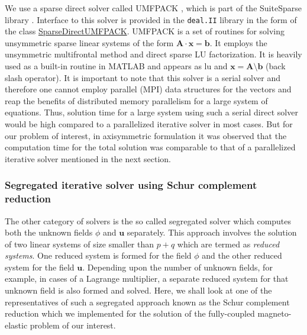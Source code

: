We use a sparse direct solver called UMFPACK \cite{davis2004algorithm}, which is part of the SuiteSparse library \cite{davis2015suitesparse}. Interface to this solver is provided in the \texttt{deal.II} \cite{dealII90} library in the form of the class \href{https://www.dealii.org/current/doxygen/deal.II/classSparseDirectUMFPACK.html}{SparseDirectUMFPACK}. UMFPACK is a set of routines for solving unsymmetric sparse linear systems of the form $\mathbf{A} \cdot \mathbf{x} = \mathbf{b}$. It employs the unsymmetric multifrontal method and direct sparse LU factorization. It is heavily used as a built-in routine in MATLAB\textsuperscript{\tiny\sffamily\textregistered} and appears as lu and $\mathbf{x} = \mathbf{A} \setminus \mathbf{b}$ (back slash operator). It is important to note that this solver is a serial solver and therefore one cannot employ parallel (MPI) data structures for the vectors and reap the benefits of distributed memory parallelism for a large system of equations. Thus, solution time for a large system using such a serial direct solver would be high compared to a parallelized iterative solver in most cases. But for our problem of interest, in axisymmetric formulation it was observed that the computation time for the total solution was comparable to that of a parallelized iterative solver mentioned in the next section.

\subsubsection{Segregated iterative solver using Schur complement reduction}
The other category of solvers is the so called segregated solver which computes both the unknown fields $\phi$ and $\mathbf{u}$ separately. This approach involves the solution of two linear systems of size smaller than $p+q$ which are termed as \textit{reduced systems}. One reduced system is formed for the field $\phi$ and the other reduced system for the field $\mathbf{u}$. Depending upon the number of unknown fields, for example, in cases of a Lagrange multiplier, a separate reduced system for that unknown field is also formed and solved. Here, we shall look at one of the representatives of such a segregated approach known as the Schur complement reduction which we implemented for the solution of the fully-coupled magneto-elastic problem of our interest. \par 

